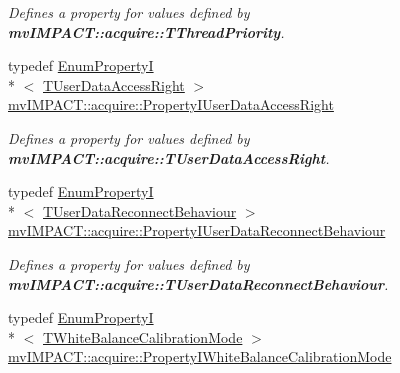 \begin{DoxyCompactItemize}
\begin{DoxyCompactList}\small\item\em Defines a property for values defined by {\bfseries mv\+I\+M\+P\+A\+C\+T\+::acquire\+::\+T\+Thread\+Priority}. \end{DoxyCompactList}\item 
\hypertarget{group___common_interface_ga047125aae9705dc31db2e88a52f6422e}{typedef \hyperlink{classmv_i_m_p_a_c_t_1_1acquire_1_1_enum_property_i}{Enum\+Property\+I}\\*
$<$ \hyperlink{group___common_interface_gabda8d2f2e8458c2edb94503478dbcbfa}{T\+User\+Data\+Access\+Right} $>$ \hyperlink{group___common_interface_ga047125aae9705dc31db2e88a52f6422e}{mv\+I\+M\+P\+A\+C\+T\+::acquire\+::\+Property\+I\+User\+Data\+Access\+Right}}\label{group___common_interface_ga047125aae9705dc31db2e88a52f6422e}

\begin{DoxyCompactList}\small\item\em Defines a property for values defined by {\bfseries mv\+I\+M\+P\+A\+C\+T\+::acquire\+::\+T\+User\+Data\+Access\+Right}. \end{DoxyCompactList}\item 
\hypertarget{group___common_interface_ga26a11fd50037db50142ec603904bcb8d}{typedef \hyperlink{classmv_i_m_p_a_c_t_1_1acquire_1_1_enum_property_i}{Enum\+Property\+I}\\*
$<$ \hyperlink{group___common_interface_ga75776c64a8383014d608b9845708aee2}{T\+User\+Data\+Reconnect\+Behaviour} $>$ \hyperlink{group___common_interface_ga26a11fd50037db50142ec603904bcb8d}{mv\+I\+M\+P\+A\+C\+T\+::acquire\+::\+Property\+I\+User\+Data\+Reconnect\+Behaviour}}\label{group___common_interface_ga26a11fd50037db50142ec603904bcb8d}

\begin{DoxyCompactList}\small\item\em Defines a property for values defined by {\bfseries mv\+I\+M\+P\+A\+C\+T\+::acquire\+::\+T\+User\+Data\+Reconnect\+Behaviour}. \end{DoxyCompactList}\item 
\hypertarget{group___common_interface_gab129f1b9a01f41a701fd35fd1fddc4d2}{typedef \hyperlink{classmv_i_m_p_a_c_t_1_1acquire_1_1_enum_property_i}{Enum\+Property\+I}\\*
$<$ \hyperlink{group___common_interface_ga7218069510c56114414c935faf5bfd09}{T\+White\+Balance\+Calibration\+Mode} $>$ \hyperlink{group___common_interface_gab129f1b9a01f41a701fd35fd1fddc4d2}{mv\+I\+M\+P\+A\+C\+T\+::acquire\+::\+Property\+I\+White\+Balance\+Calibration\+Mode}}\label{group___common_interface_gab129f1b9a01f41a701fd35fd1fddc4d2}


\end{DoxyCompactItemize}
